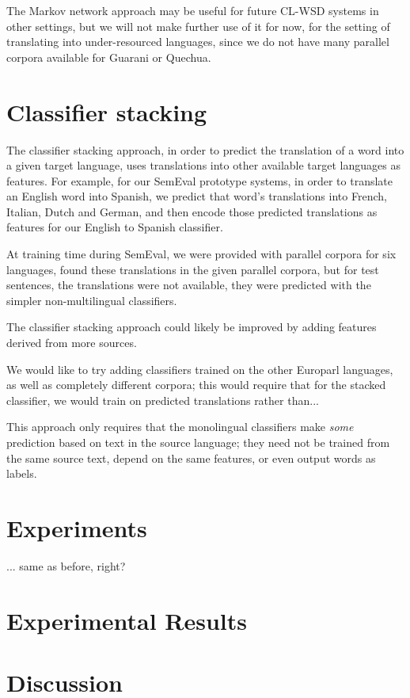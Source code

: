 The Markov network approach may be useful for future CL-WSD systems in other
settings, but we will not make further use of it for now, for the setting of
translating into under-resourced languages, since we do not have many parallel
corpora available for Guarani or Quechua.

\section{Classifier stacking}
The classifier stacking approach, in order to predict the translation of a word
into a given target language, uses translations into other available target
languages as features.
For example, for our SemEval prototype systems, in order to translate an
English word into Spanish, we predict that word's translations into French,
Italian, Dutch and German, and then encode those predicted translations as
features for our English to Spanish classifier.

At training time during SemEval, we were provided with parallel corpora for six
languages, found these translations in the given parallel corpora, but
for test sentences, the translations were not available, they were predicted
with the simpler non-multilingual classifiers.

The classifier stacking approach could likely be improved by adding features
derived from more sources.

We would like to try adding classifiers trained on the other Europarl
languages, as well as completely different corpora; this would require that for
the stacked classifier, we would train on predicted translations rather than...

This approach only requires that the monolingual classifiers make \emph{some}
prediction based on text in the source language; they need not be trained from
the same source text, depend on the same features, or even output words as
labels.

\section{Experiments}
\label{sec:multilingual-experiments}
... same as before, right?

\section{Experimental Results}
\label{sec:multilingual-results}

\section{Discussion}

